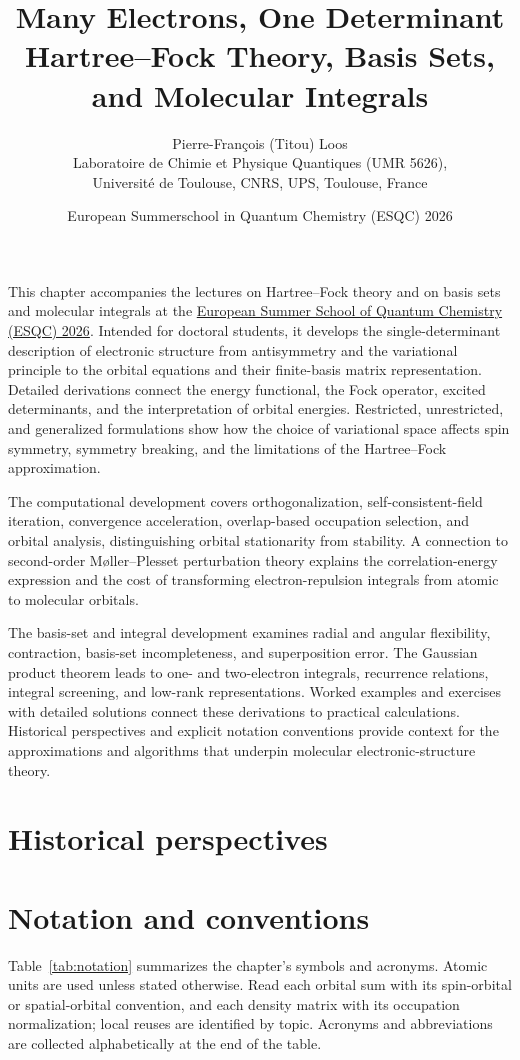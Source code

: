 \documentclass[11pt,a4paper,titlepage]{article}
\title{\color{hfGreenDark}Many Electrons, One Determinant\\[0.5em]
  \large Hartree--Fock Theory, Basis Sets, and Molecular Integrals}
\author{
	Pierre-Fran\c{c}ois (Titou) Loos
	\bigskip
	\\
	\small Laboratoire de Chimie et Physique Quantiques (UMR 5626), \\
	\small Universit\'e de Toulouse, CNRS, UPS, Toulouse, France
}
\date{European Summerschool in Quantum Chemistry (ESQC) 2026}
\makeatletter
\newcommand{\listofhistoricalperspectives}{%
  \phantomsection
  \section*{Historical perspectives}
  \addcontentsline{toc}{section}{Historical perspectives}
  \@starttoc{loh}}
\numberwithin{equation}{section}
\renewcommand{\maketitle}{}
\makeatother
\begin{document}
\hypersetup{pageanchor=false}
\maketitle
{}
\hypersetup{pageanchor=true}
\begin{hfabstract}
This chapter accompanies the lectures on Hartree--Fock theory and on basis
sets and molecular integrals at the \href{https://www.esqc.org}{European Summer School of Quantum
Chemistry (ESQC) 2026}. Intended for doctoral students, it develops the
single-determinant description of electronic structure from antisymmetry and
the variational principle to the orbital equations and their finite-basis
matrix representation. Detailed derivations connect the energy functional,
the Fock operator, excited determinants, and the interpretation of orbital
energies. Restricted, unrestricted, and generalized formulations show how
the choice of variational space affects spin symmetry, symmetry breaking,
and the limitations of the Hartree--Fock approximation.

The computational development covers orthogonalization, self-consistent-field
iteration, convergence acceleration, overlap-based occupation selection,
and orbital analysis, distinguishing orbital stationarity from stability.
A connection to second-order M{\o}ller--Plesset perturbation theory explains
the correlation-energy expression and the cost of transforming
electron-repulsion integrals from atomic to molecular orbitals.

The basis-set and integral development examines radial and angular
flexibility, contraction, basis-set incompleteness, and superposition error.
The Gaussian product theorem leads to one- and two-electron integrals,
recurrence relations, integral screening, and low-rank representations.
Worked examples and exercises with detailed solutions connect these
derivations to practical calculations. Historical perspectives and explicit
notation conventions provide context for the approximations and algorithms
that underpin molecular electronic-structure theory.
\end{hfabstract}
\clearpage
\tableofcontents
\clearpage
\listofhistoricalperspectives
\clearpage
{}
\section*{Notation and conventions}

Table~\ref{tab:notation} summarizes the chapter's symbols and acronyms.
Atomic units are used unless stated otherwise. Read each
orbital sum with its spin-orbital or spatial-orbital convention, and each
density matrix with its occupation normalization; local reuses are identified
by topic. Acronyms and abbreviations are collected alphabetically at the end
of the table.
\end{document}
